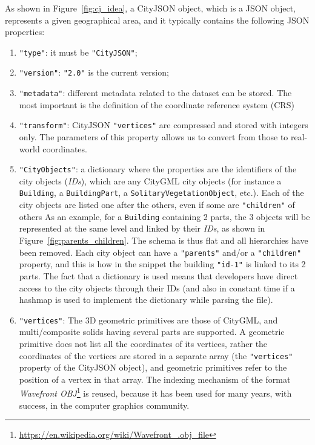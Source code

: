 \documentclass{isprs} %
\begin{document}
As shown in Figure~\ref{fig:cj_idea}, a CityJSON object, which is a JSON object, represents a given geographical area, and it typically contains the following JSON properties: 
\begin{enumerate}
  \item \texttt{"type"}: it must be \texttt{"CityJSON"};
  \item \texttt{"version"}: \texttt{"2.0"} is the current version;
  \item \texttt{"metadata"}: different metadata related to the dataset can be stored. The most important is the definition of the coordinate reference system (CRS)
  \item \texttt{"transform"}: CityJSON \texttt{"vertices"} are compressed and stored with integers only. The parameters of this property allows us to convert from those to real-world coordinates.
  \item \texttt{"CityObjects"}: a dictionary where the properties are the identifiers of the city objects (\emph{IDs}), which are any CityGML city objects (for instance a \texttt{Building}, a \texttt{BuildingPart}, a \texttt{SolitaryVegetationObject}, etc.).
  Each of the city objects are listed one after the others, even if some are \texttt{"children"} of others 
  As an example, for a \texttt{Building} containing 2 parts, the 3 objects will be represented at the same level and linked by their \emph{IDs}, as shown in Figure~\ref{fig:parents_children}. The schema is thus flat and all hierarchies have been removed.
  Each city object can have a \texttt{"parents"} and/or a \texttt{"children"} property, and this is how in the snippet the building \texttt{"id-1"} is linked to its 2 parts.
  The fact that a dictionary is used means that developers have direct access to the city objects through their IDs (and also in constant time if a hashmap is used to implement the dictionary while parsing the file).
  \item \texttt{"vertices"}: The 3D geometric primitives are those of CityGML, and multi/composite solids having several parts are supported.
  A geometric primitive does not list all the coordinates of its vertices, rather the coordinates of the vertices are stored in a separate array (the \texttt{"vertices"} property of the CityJSON object), and geometric primitives refer to the position of a vertex in that array.
  The indexing mechanism of the format \emph{Wavefront OBJ}\footnote{\url{https://en.wikipedia.org/wiki/Wavefront_.obj_file}} is reused, because it has been used for many years, with success, in the computer graphics community.

\end{enumerate}
\end{document}
